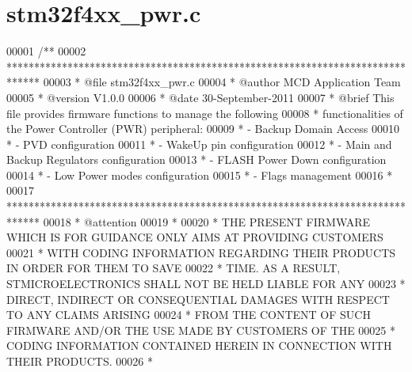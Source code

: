 \section{stm32f4xx\+\_\+pwr.\+c}
\label{stm32f4xx__pwr_8c_source}

\begin{DoxyCode}
00001 \textcolor{comment}{/**}
00002 \textcolor{comment}{  ******************************************************************************}
00003 \textcolor{comment}{  * @file    stm32f4xx\_pwr.c}
00004 \textcolor{comment}{  * @author  MCD Application Team}
00005 \textcolor{comment}{  * @version V1.0.0}
00006 \textcolor{comment}{  * @date    30-September-2011}
00007 \textcolor{comment}{  * @brief   This file provides firmware functions to manage the following }
00008 \textcolor{comment}{  *          functionalities of the Power Controller (PWR) peripheral:           }
00009 \textcolor{comment}{  *           - Backup Domain Access}
00010 \textcolor{comment}{  *           - PVD configuration}
00011 \textcolor{comment}{  *           - WakeUp pin configuration}
00012 \textcolor{comment}{  *           - Main and Backup Regulators configuration}
00013 \textcolor{comment}{  *           - FLASH Power Down configuration}
00014 \textcolor{comment}{  *           - Low Power modes configuration}
00015 \textcolor{comment}{  *           - Flags management}
00016 \textcolor{comment}{  *               }
00017 \textcolor{comment}{  ******************************************************************************}
00018 \textcolor{comment}{  * @attention}
00019 \textcolor{comment}{  *}
00020 \textcolor{comment}{  * THE PRESENT FIRMWARE WHICH IS FOR GUIDANCE ONLY AIMS AT PROVIDING CUSTOMERS}
00021 \textcolor{comment}{  * WITH CODING INFORMATION REGARDING THEIR PRODUCTS IN ORDER FOR THEM TO SAVE}
00022 \textcolor{comment}{  * TIME. AS A RESULT, STMICROELECTRONICS SHALL NOT BE HELD LIABLE FOR ANY}
00023 \textcolor{comment}{  * DIRECT, INDIRECT OR CONSEQUENTIAL DAMAGES WITH RESPECT TO ANY CLAIMS ARISING}
00024 \textcolor{comment}{  * FROM THE CONTENT OF SUCH FIRMWARE AND/OR THE USE MADE BY CUSTOMERS OF THE}
00025 \textcolor{comment}{  * CODING INFORMATION CONTAINED HEREIN IN CONNECTION WITH THEIR PRODUCTS.}
00026 \textcolor{comment}{  *}

\end{DoxyCode}
